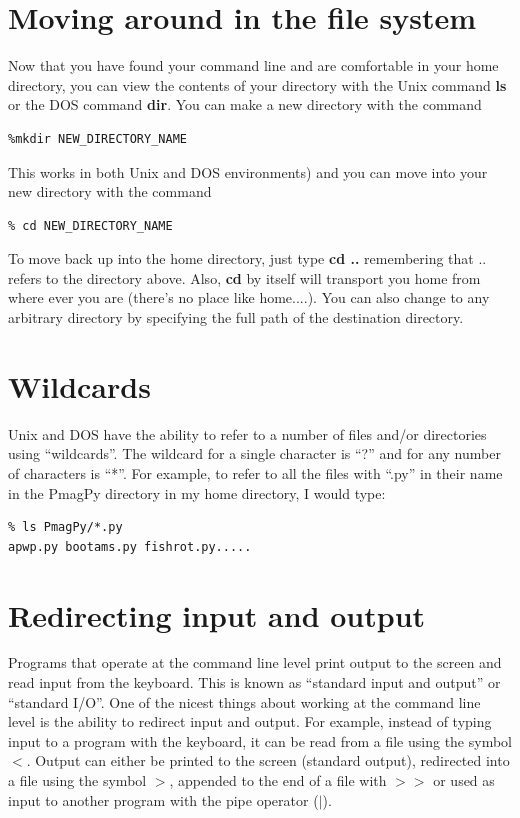 \documentclass[11pt]{book}
\begin{document}
{\section{Moving around in the file system}

Now that you have found your command line and are comfortable in your home directory, you can view the contents of your directory with the Unix command {\bf ls} or the DOS command {\bf dir}.  
You can make a new directory with the command 
\begin{verbatim}
%mkdir NEW_DIRECTORY_NAME 
\end{verbatim}
This works in both Unix and DOS environments) and you can move into your new directory with the command 
\begin{verbatim}
% cd NEW_DIRECTORY_NAME
\end{verbatim}
   To move back up into the home directory, just type {\bf cd ..} remembering that .. refers to the directory above.  Also, {\bf cd} by itself will transport you home from where ever you are (there's no place like home....).     You can also change to any arbitrary directory by specifying the full path of the destination directory. 


\section {Wildcards}

Unix and DOS have the ability to refer to a number of files and/or directories using
``wildcards''.  The  wildcard for a  single character is ``?'' and for any number of
characters is ``*''.  For example, to refer to all the files with ``.py'' in their name in the PmagPy directory in my home directory, 
I would type:

\begin{verbatim}
% ls PmagPy/*.py
apwp.py bootams.py fishrot.py.....
\end{verbatim}



\section {Redirecting input and output}

Programs that operate at the command line level print  output to the screen and read input
from the keyboard. This is
known as ``standard input and output'' or ``standard I/O''.
One of the nicest things about working at the command line level is the ability to redirect input and output.
For example, instead of typing input to a program with the keyboard, it can
be read from a file using the symbol {\bf $<$}.   Output can either be printed to the screen (standard output), redirected into a 
file using the symbol {\bf $>$}, appended to the end of a file with {\bf $>>$} or 
used as input to another program with the pipe operator ({\bf$ |$}).



}
\end{document}
